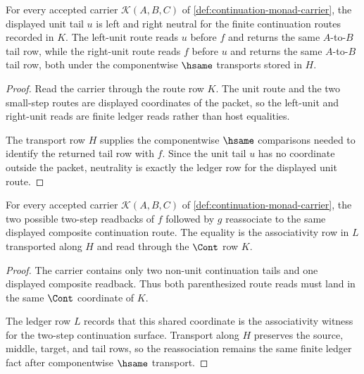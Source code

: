 \begin{theorem}
\label{thm:continuation-monad-unit-laws}
For every accepted carrier $\mathcal{K}(A,B,C)$ of \autoref{def:continuation-monad-carrier}, the displayed unit tail $u$ is left and right neutral for the finite continuation routes recorded in $K$. The left-unit route reads $u$ before $f$ and returns the same $A$-to-$B$ tail row, while the right-unit route reads $f$ before $u$ and returns the same $A$-to-$B$ tail row, both under the componentwise $\hsame$ transports stored in $H$.
\end{theorem}
\begin{proof}
Read the carrier through the route row $K$. The unit route and the two small-step routes are displayed coordinates of the packet, so the left-unit and right-unit reads are finite ledger reads rather than host equalities.

The transport row $H$ supplies the componentwise $\hsame$ comparisons needed to identify the returned tail row with $f$. Since the unit tail $u$ has no coordinate outside the packet, neutrality is exactly the ledger row for the displayed unit route.
\end{proof}

\begin{theorem}
\label{thm:continuation-monad-associativity}
For every accepted carrier $\mathcal{K}(A,B,C)$ of \autoref{def:continuation-monad-carrier}, the two possible two-step readbacks of $f$ followed by $g$ reassociate to the same displayed composite continuation route. The equality is the associativity row in $L$ transported along $H$ and read through the $\Cont$ row $K$.
\end{theorem}
\begin{proof}
The carrier contains only two non-unit continuation tails and one displayed composite readback. Thus both parenthesized route reads must land in the same $\Cont$ coordinate of $K$.

The ledger row $L$ records that this shared coordinate is the associativity witness for the two-step continuation surface. Transport along $H$ preserves the source, middle, target, and tail rows, so the reassociation remains the same finite ledger fact after componentwise $\hsame$ transport.
\end{proof}

